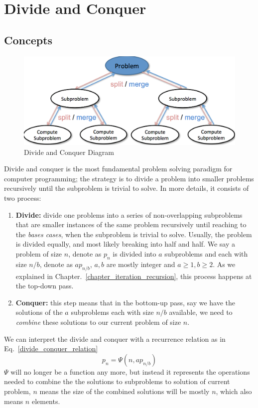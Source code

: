 \documentclass[../main.tex]{subfiles}
\begin{document}
\section{Divide and Conquer}
\subsection{Concepts}
\label{sec_divide_conquer}
\begin{figure}[h]
    \centering
    \includegraphics[width=0.8\columnwidth]{fig/divide_conquer.png}
    \caption{Divide and Conquer Diagram}
    \label{fig:divide_conquer}
\end{figure}
Divide and conquer is the most fundamental problem solving paradigm for computer programming; the strategy is to divide a problem into smaller problems recursively until the subproblem is trivial to solve. In more details, it consists of two process:
\begin{enumerate}
    \item \textbf{Divide:} divide one problems into a series of non-overlapping subproblems that are smaller instances of the same problem recursively until reaching to the \textit{bases cases},  when the subproblem is trivial to solve. Usually, the problem is divided equally, and most likely breaking into half and half. We say a problem of size $n$, denote as $p_n$ is divided into $a$ subproblems and each with size $n/b$, denote as $a p_{n/b}$, $a, b$ are mostly integer and $a\geq 1, b\geq 2$. As we explained in Chapter.~\ref{chapter_iteration_recursion}, this process happens at the top-down pass. 
    \item \textbf{Conquer:} this step means that in the bottom-up pass, say we have the solutions of the $a$ subproblems each with size $n/b$ available, we need to \textit{combine} these solutions to our  current problem of size $n$.
\end{enumerate}
We can interpret the divide and conquer  with a recurrence relation as in Eq.~\ref{divide_conquer_relation}
    \begin{equation}
        p_n= \Psi(n,a p_{n/b})
        \label{divide_conquer_relation}
    \end{equation}
    $\Psi$ will no longer be a function any more, but instead it represents the operations needed to combine the the solutions to subproblems to solution of current problem, $n$ means the size of the combined solutions will be mostly $n$, which also means $n$ elements. 
\end{document}
